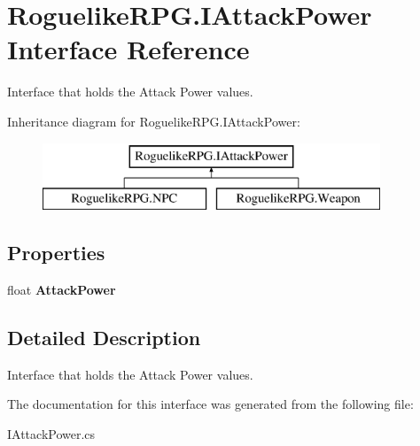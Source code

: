 \hypertarget{interface_roguelike_r_p_g_1_1_i_attack_power}{}\section{Roguelike\+R\+P\+G.\+I\+Attack\+Power Interface Reference}
\label{interface_roguelike_r_p_g_1_1_i_attack_power}


Interface that holds the Attack Power values.  


Inheritance diagram for Roguelike\+R\+P\+G.\+I\+Attack\+Power\+:\begin{figure}[H]
\begin{center}
\leavevmode
\includegraphics[height=2.000000cm]{interface_roguelike_r_p_g_1_1_i_attack_power}
\end{center}
\end{figure}
\subsection*{Properties}
\begin{DoxyCompactItemize}
\item 
\mbox{\label{interface_roguelike_r_p_g_1_1_i_attack_power_a42a0c319db9e218045c4fd2b57d6e582}} 
float {\bfseries Attack\+Power}
\end{DoxyCompactItemize}


\subsection{Detailed Description}
Interface that holds the Attack Power values. 



The documentation for this interface was generated from the following file\+:\begin{DoxyCompactItemize}
\item 
I\+Attack\+Power.\+cs\end{DoxyCompactItemize}
